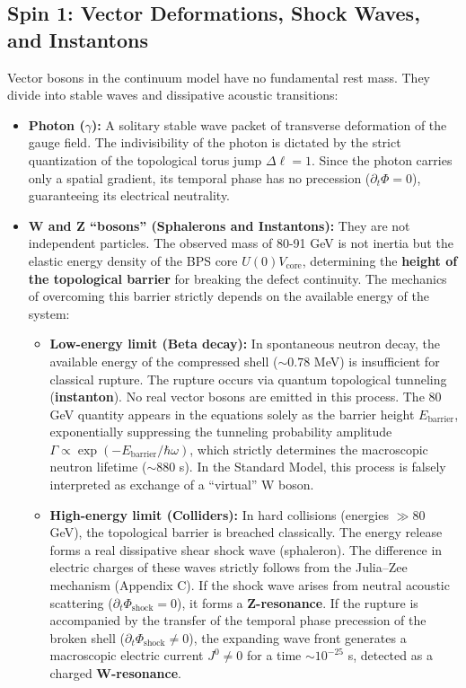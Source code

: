\documentclass[11pt,a4paper]{article}
\begin{document}
\subsection{Spin 1: Vector Deformations, Shock Waves, and Instantons}
Vector bosons in the continuum model have no fundamental rest mass. They divide into stable waves and dissipative acoustic transitions:
\begin{itemize}
\item \textbf{Photon ($\gamma$):} A solitary stable wave packet of transverse deformation of the gauge field. The indivisibility of the photon is dictated by the strict quantization of the topological torus jump $\Delta \ell = 1$. Since the photon carries only a spatial gradient, its temporal phase has no precession ($\partial_t \Phi = 0$), guaranteeing its electrical neutrality.

\item \textbf{W and Z ``bosons'' (Sphalerons and Instantons):} They are not independent particles. The observed mass of 80-91 GeV is not inertia but the elastic energy density of the BPS core $U(0)V_{\text{core}}$, determining the \textbf{height of the topological barrier} for breaking the defect continuity. The mechanics of overcoming this barrier strictly depends on the available energy of the system:
\begin{itemize}
\item \textbf{Low-energy limit (Beta decay):} In spontaneous neutron decay, the available energy of the compressed shell ($\sim 0.78$ MeV) is insufficient for classical rupture. The rupture occurs via quantum topological tunneling (\textbf{instanton}). No real vector bosons are emitted in this process. The 80 GeV quantity appears in the equations solely as the barrier height $E_{\text{barrier}}$, exponentially suppressing the tunneling probability amplitude $\Gamma \propto \exp(-E_{\text{barrier}}/\hbar \omega)$, which strictly determines the macroscopic neutron lifetime ($\sim 880$ s). In the Standard Model, this process is falsely interpreted as exchange of a ``virtual'' W boson.
\item \textbf{High-energy limit (Colliders):} In hard collisions (energies $\gg 80$ GeV), the topological barrier is breached classically. The energy release forms a real dissipative shear shock wave (sphaleron). The difference in electric charges of these waves strictly follows from the Julia–Zee mechanism (Appendix C). If the shock wave arises from neutral acoustic scattering ($\partial_t \Phi_{\text{shock}} = 0$), it forms a \textbf{Z-resonance}. If the rupture is accompanied by the transfer of the temporal phase precession of the broken shell ($\partial_t \Phi_{\text{shock}} \neq 0$), the expanding wave front generates a macroscopic electric current $J^0 \neq 0$ for a time $\sim 10^{-25}$ s, detected as a charged \textbf{W-resonance}.
\end{itemize}
\end{itemize}
\end{document}
